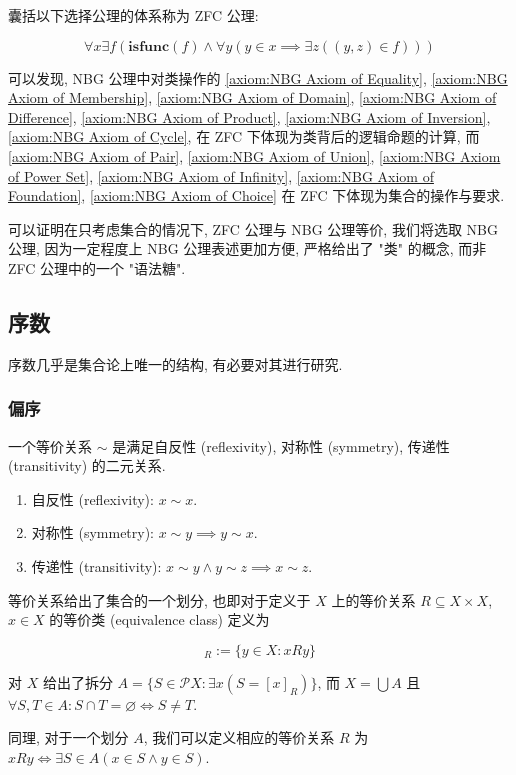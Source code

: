 囊括以下选择公理的体系称为 ZFC 公理:

\begin{axiom}
    \label {axiom:ZF Axiom of Choice}
    \[
        \forall x \exists f (\mathbf{isfunc} (f) \land \forall y (y \in x \implies \exists z ((y,z) \in f)))
    \]
\end{axiom}

可以发现, NBG 公理中对类操作的 \ref{axiom:NBG Axiom of Equality}, \ref{axiom:NBG Axiom of Membership},
\ref{axiom:NBG Axiom of Domain}, \ref{axiom:NBG Axiom of Difference}, \ref{axiom:NBG Axiom of Product},
\ref{axiom:NBG Axiom of Inversion}, \ref{axiom:NBG Axiom of Cycle}, 在 ZFC 下体现为类背后的逻辑命题的计算,
而 \ref{axiom:NBG Axiom of Pair}, \ref{axiom:NBG Axiom of Union}, \ref{axiom:NBG Axiom of Power Set},
\ref{axiom:NBG Axiom of Infinity}, \ref{axiom:NBG Axiom of Foundation}, \ref{axiom:NBG Axiom of Choice}
在 ZFC 下体现为集合的操作与要求.

可以证明在只考虑集合的情况下, ZFC 公理与 NBG 公理等价, 我们将选取 NBG 公理, 因为一定程度上 NBG 公理表述更加方便, 严格给出了 "类" 的概念, 而非 ZFC 公理中的一个 "语法糖".

\subsection{序数}

序数几乎是集合论上唯一的结构, 有必要对其进行研究.

\subsubsection{偏序}

\begin{definition}
    一个等价关系 \(\sim\) 是满足自反性 (reflexivity), 对称性 (symmetry), 传递性 (transitivity) 的二元关系.
    \begin{enumerate}
        \item 自反性 (reflexivity): \(x \sim x\).
        \item 对称性 (symmetry): \(x \sim y \implies y \sim x\).
        \item 传递性 (transitivity): \(x \sim y \land y \sim z \implies x \sim z\).
    \end{enumerate}


    等价关系给出了集合的一个划分, 也即对于定义于 \(X\) 上的等价关系 \(R \subseteq X \times X\), \(x \in X\) 的等价类 (equivalence class) 定义为

    \begin{equation}
        [x]_R := \{y \in X : x R y\}
    \end{equation}

    对 \(X\) 给出了拆分 \(A = \{S \in \mathcal{P} X : \exists x (S = [x]_R)\}\),
    而 \(X = \bigcup A\) 且 \(\forall S, T \in A : S \cap T = \varnothing \iff S \neq T\).

    同理, 对于一个划分 \(A\), 我们可以定义相应的等价关系 \(R\) 为 \(x R y \iff \exists S \in A (x \in S \land y \in S)\).
\end{definition}



